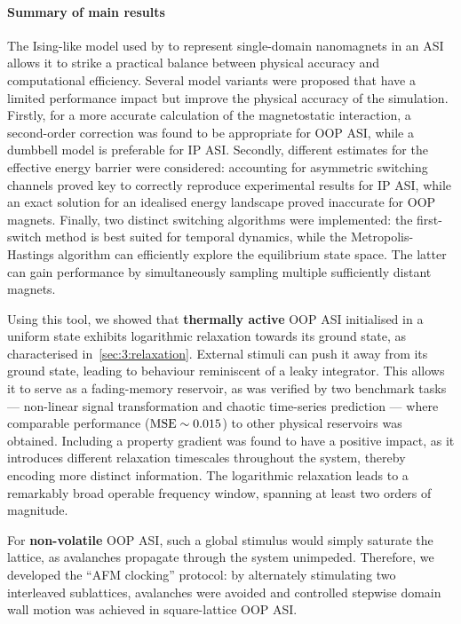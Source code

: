\paragraph{Summary of main results}
The Ising-like model used by \textbf{\hotspice} to represent single-domain nanomagnets in an ASI allows it to strike a practical balance between physical accuracy and computational efficiency.
Several model variants were proposed that have a limited performance impact but improve the physical accuracy of the simulation.
Firstly, for a more accurate calculation of the magnetostatic interaction, a second-order correction was found to be appropriate for OOP ASI, while a dumbbell model is preferable for IP ASI. %
Secondly, different estimates for the effective energy barrier were considered: accounting for asymmetric switching channels proved key to correctly reproduce experimental results for IP ASI, while an exact solution for an idealised energy landscape proved inaccurate for OOP magnets. %
Finally, two distinct switching algorithms were implemented: the first-switch method is best suited for temporal dynamics, while the Metropolis-Hastings algorithm can efficiently explore the equilibrium state space.
The latter can gain performance by simultaneously sampling multiple sufficiently distant magnets. \par
Using this tool, we showed that \textbf{thermally active} OOP ASI initialised in a uniform state exhibits logarithmic relaxation towards its ground state, as characterised in~\cref{sec:3:relaxation}.
External stimuli can push it away from its ground state, leading to behaviour reminiscent of a leaky integrator.
This allows it to serve as a fading-memory reservoir, as was verified by two benchmark tasks --- non-linear signal transformation and chaotic time-series prediction --- where comparable performance ($\mathrm{MSE} \sim 0.015$) to other physical reservoirs was obtained.
Including a property gradient was found to have a positive impact, as it introduces different relaxation timescales throughout the system, thereby encoding more distinct information.
The logarithmic relaxation leads to a remarkably broad operable frequency window, spanning at least two orders of magnitude. \par
For \textbf{non-volatile} OOP ASI, such a global stimulus would simply saturate the lattice, as avalanches propagate through the system unimpeded.
Therefore, we developed the ``AFM clocking'' protocol: by alternately stimulating two interleaved sublattices, avalanches were avoided and controlled stepwise domain wall motion was achieved in square-lattice OOP ASI.
